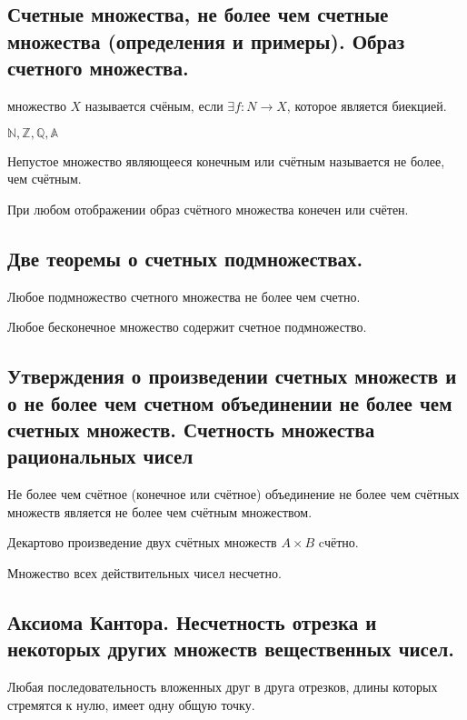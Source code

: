 \documentclass{article}
\begin{document}
\subsection{Счетные множества, не более чем счетные множества (определения и примеры). Образ счетного множества.}
 множество $X$ называется счёным, если $\exists f: N \to X$, которое является биекцией.

 $\mathbb{N}, \mathbb{Z}, \mathbb{Q}, \mathbb{A}$

 Непустое множество являющееся конечным или счётным называется не более, чем счётным. 

 При любом отображении образ счётного множества конечен или счётен.

\subsection{Две теоремы о счетных подмножествах.}

 Любое подмножество счетного множества не более чем счетно.

 Любое бесконечное множество содержит счетное подмножество.


\subsection{Утверждения о произведении счетных множеств и о не более чем счетном объединении не более чем счетных множеств. Счетность множества рациональных чисел}

 Не более чем счётное (конечное или счётное) объединение не более чем счётных множеств является не более чем счётным множеством.

 Декартово произведение двух счётных множеств $A \times B$ cчётно.

 Множество всех действительных чисел несчетно. 

\subsection{Аксиома Кантора. Несчетность отрезка и некоторых других множеств вещественных чисел.}

 Любая последовательность вложенных друг в друга отрезков, длины которых стремятся к нулю, имеет одну общую точку.
\end{document}
